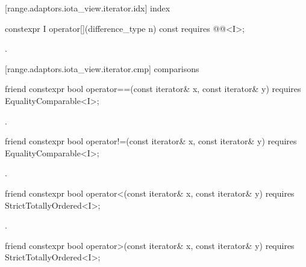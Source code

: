 [range.adaptors.iota_view.iterator.idx]{ index}

\begin{itemdecl}
constexpr I operator[](difference_type n) const
  requires @@<I>;
\end{itemdecl}

\begin{itemdescr}
\pnum
\returns {}.
\end{itemdescr}

[range.adaptors.iota_view.iterator.cmp]{ comparisons}

\begin{itemdecl}
friend constexpr bool operator==(const iterator& x, const iterator& y)
  requires EqualityComparable<I>;
\end{itemdecl}

\begin{itemdescr}
\pnum
\returns {}.
\end{itemdescr}

\begin{itemdecl}
friend constexpr bool operator!=(const iterator& x, const iterator& y)
  requires EqualityComparable<I>;
\end{itemdecl}

\begin{itemdescr}
\pnum
\returns {}.
\end{itemdescr}

\begin{itemdecl}
friend constexpr bool operator<(const iterator& x, const iterator& y)
  requires StrictTotallyOrdered<I>;
\end{itemdecl}

\begin{itemdescr}
\pnum
\returns {}.
\end{itemdescr}

\begin{itemdecl}
friend constexpr bool operator>(const iterator& x, const iterator& y)
  requires StrictTotallyOrdered<I>;
\end{itemdecl}

